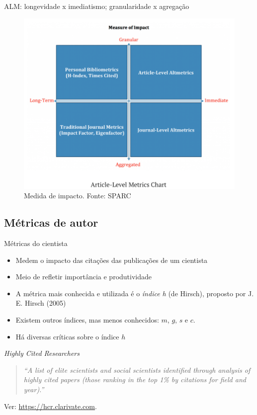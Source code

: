 \begin{frame}{ALM: longevidade x imediatismo; granularidade x agregação}
\begin{figure}
\centering
\includegraphics[scale=0.2]{figs/03/alm}
\caption{Medida de impacto. Fonte: SPARC}
\end{figure}
\end{frame}

\subsection*{Métricas de autor}

\begin{frame}{Métricas do cientista}
\begin{itemize}
\item Medem o impacto das citações das publicações de um cientista
\item Meio de refletir importância e produtividade
\item A métrica mais conhecida e utilizada é o \textit{índice h} (de Hirsch), proposto por J. E. Hirsch (2005)
\item Existem outros índices, mas menos conhecidos: $m$, $g$, $s$ e $c$. 
\item Há diversas críticas sobre o índice $h$
\end{itemize}
\end{frame}

\begin{frame}{\textit{Highly Cited Researchers}}

\begin{quotation}
\textit{``A list of elite scientists and social scientists identified through analysis of highly cited papers (those ranking in the top 1\% by citations for field and year).''}
\end{quotation}

Ver: \url{https://hcr.clarivate.com}.

\end{frame}


